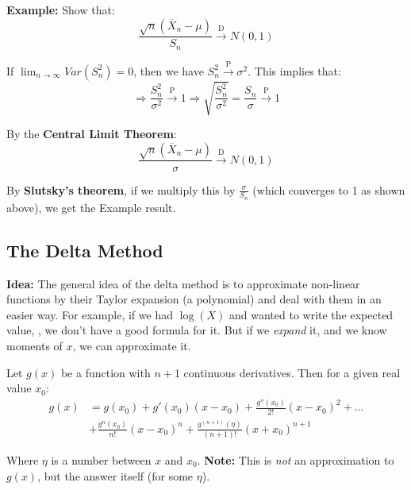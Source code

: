\documentclass{article}
\begin{document}
\begin{enumerate}
    \textbf{Example:} Show that:
    \begin{equation*}
        \frac{\sqrt{n}(\overline{X}_n - \mu)}{S_n} \xrightarrow{\text{D}} N(0,1)
    \end{equation*}
    
    If $\lim_{n\to\infty} Var(S_n^2) = 0$, then we have $S_n^2 \xrightarrow{\text{P}} \sigma^2$. This implies that:
    \begin{equation*}
        \Rightarrow \frac{S_n^2}{\sigma^2} \xrightarrow{\text{P}} 1 \Rightarrow \sqrt{\frac{S_n^2}{\sigma^2}} = \frac{S_n}{\sigma} \xrightarrow{\text{P}} 1
    \end{equation*}
    
    By the \textbf{Central Limit Theorem}:
    \begin{equation*}
        \frac{\sqrt{n}(\overline{X}_n -\mu) }{\sigma} \xrightarrow{\text{D}} N(0,1)
    \end{equation*}
    
    By \textbf{Slutsky's theorem}, if we multiply this by $\frac{\sigma}{S_n}$ (which converges to 1 as shown above), we get the Example result.
\end{enumerate}

\subsection{The Delta Method}

\textbf{Idea:} The general idea of the delta method is to approximate non-linear functions by their Taylor expansion (a  polynomial) and deal with them in an easier way. For example, if we had $\log(X)$ and wanted to write the expected value, , we don't have a good formula for it. But if we \textit{expand} it, and we know moments of $x$, we can approximate it.

Let $g(x)$ be a function with $n+1$ continuous derivatives. Then for a given real value $x_0$:
\begin{equation*}
\begin{split}
    g(x) &= g(x_0) + g'(x_0)(x-x_0) + \frac{g''(x_0)}{2!}(x-x_0)^2 + \dots \\
    &+ \frac{g^n(x_0)}{n!}(x-x_0)^n + \frac{g^{(n+1)}(\eta)}{(n+1)!}(x+x_0)^{n+1}
    \end{split}
\end{equation*}

Where $\eta$ is a number between $x$ and $x_0$. \textbf{Note:} This is \textit{not} an approximation to $g(x)$, but the answer itself (for some $\eta$).
\end{document}

